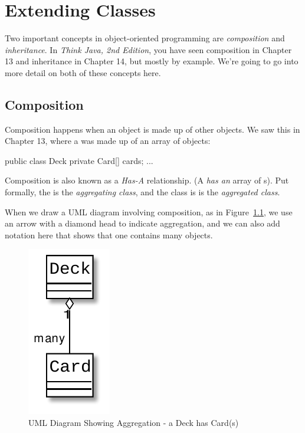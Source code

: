 \chapter{Extending Classes}

Two important concepts in object-oriented programming are {\em composition} and {\em inheritance}. In {\em Think Java, 2nd Edition}, you have seen composition in Chapter 13 and inheritance in Chapter 14, but mostly by example. We're going to go into more detail on both of these concepts here.

\section{Composition}

Composition happens when an object is made up of other objects. We saw this in Chapter 13, where a  was made up of an array of  objects:

\begin{code}
public class Deck {
    private Card[] cards; 
    ...
}
\end{code}

Composition is also known as a {\em Has-A} relationship.  (A  {\em has an} array of s).  Put formally, the  is the {\em aggregating class}, and the  class is is the {\em aggregated class}.

When we draw a UML diagram involving composition, as in Figure~\ref{fig.aggregation}, we use an arrow with a diamond head to indicate aggregation, and we can also add notation here that shows that one  contains many  objects.

\begin{figure}[!h]
\begin{center}
\includegraphics[scale=0.75]{figs/ch14/aggregation.pdf}
\caption{UML Diagram Showing Aggregation - a Deck has Card(s)}
\label{fig.aggregation}
\end{center}
\end{figure}

